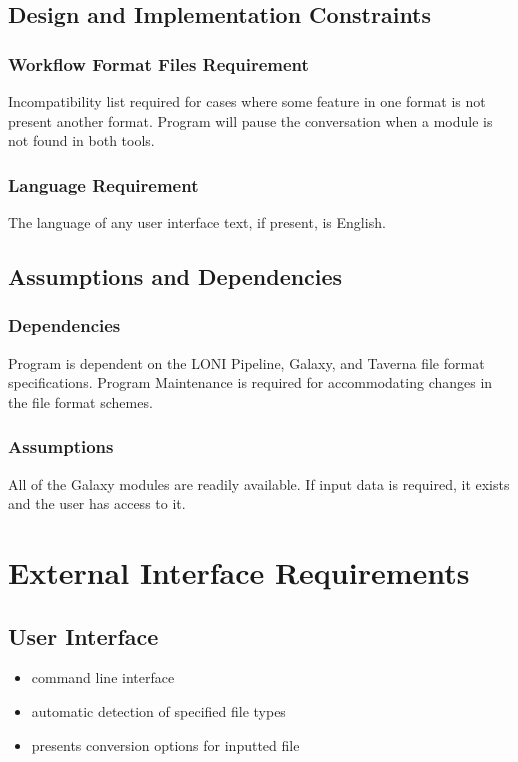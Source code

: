 \documentclass[12pt]{article}
\begin{document}
\subsection{Design and Implementation Constraints}
\subsubsection{Workflow Format Files Requirement}
Incompatibility list required for cases where some feature in one format is not present another format. Program will pause the conversation when a module is not found in both tools.


\subsubsection{Language Requirement}
The language of any user interface text, if present, is English.

\subsection{Assumptions and Dependencies}
\subsubsection{Dependencies}
Program is dependent on the LONI Pipeline, Galaxy, and Taverna file format specifications. Program Maintenance is required for accommodating changes in the file format schemes.


\subsubsection{Assumptions}
All of the Galaxy modules are readily available.  If input data is required, it exists and the user has access to it.
        
\section{External Interface Requirements}
\subsection{User Interface}
\begin{itemize}
\item command line interface
\item automatic detection of specified file types
\item presents conversion options for inputted file
\end{itemize}
\end{document}
